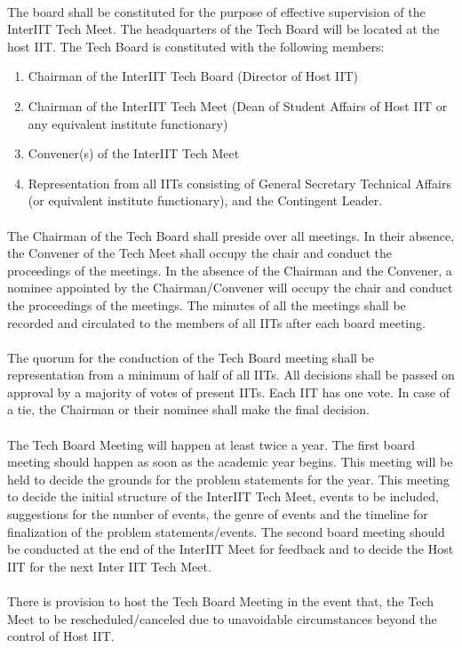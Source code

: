 \paragraph{}
The board shall be constituted for the purpose of effective supervision of the InterIIT Tech Meet. The headquarters of the Tech Board will be located at the host IIT. The Tech Board is constituted with the following members:
\begin{enumerate}
    \item Chairman of the InterIIT Tech Board (Director of Host IIT)
    \item Chairman of the InterIIT Tech Meet (Dean of Student Affairs of Host IIT or any equivalent institute functionary)
    \item Convener(s) of the InterIIT Tech Meet
    \item Representation from all IITs consisting of General Secretary Technical Affairs (or equivalent institute functionary), and the Contingent Leader.
\end{enumerate}

\paragraph{}
The Chairman of the Tech Board shall preside over all meetings. In their absence, the Convener of the Tech Meet shall occupy the chair and conduct the proceedings of the meetings. In the absence of the Chairman and the Convener, a nominee appointed by the Chairman/Convener will occupy the chair and conduct the proceedings of the meetings. The minutes of all the meetings shall be recorded and circulated to the members of all IITs after each board meeting.

\paragraph{}
The quorum for the conduction of the Tech Board meeting shall be representation from a minimum of half of all IITs. All decisions shall be passed on approval by a majority of votes of present IITs. Each IIT has one vote. In case of a tie, the Chairman or their nominee shall make the final decision.

\paragraph{}
The Tech Board Meeting will happen at least twice a year. The first board meeting should happen as soon as the academic year begins. This meeting will be held to decide the grounds for the problem statements for the year. This meeting to decide the initial structure of the InterIIT Tech Meet, events to be included, suggestions for the number of events, the genre of events and the timeline for finalization of the problem statements/events. The second board meeting should be conducted at the end of the InterIIT Meet for feedback and to decide the Host IIT for the next Inter IIT Tech Meet.

\paragraph{}
There is provision to host the Tech Board Meeting in the event that, the Tech Meet to be rescheduled/canceled due to unavoidable circumstances beyond the control of Host IIT.